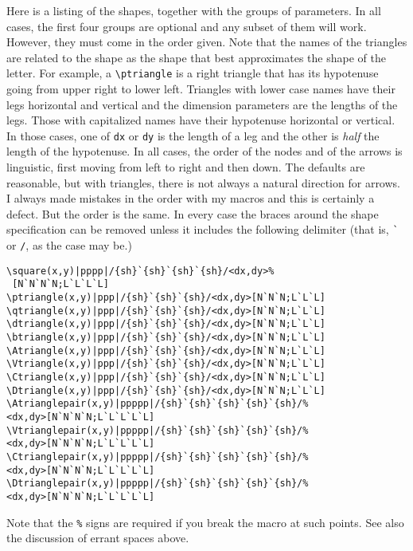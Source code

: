\documentclass[12pt]{article}
\begin{document}
{Here is a listing of the shapes, together with the groups of parameters.
In all cases, the first four groups are optional and any subset of them
will work.  However, they must come in the order given.  Note that the
names of the triangles are related to the shape as the shape that best
approximates the shape of the letter.  For example, a
\verb.\ptriangle. is a right triangle that has its
hypotenuse going from upper right to lower left.  Triangles with lower
case names have their legs horizontal and vertical and the dimension
parameters are the lengths of the legs.  Those with capitalized names
have their hypotenuse horizontal or vertical.  In those cases, one of
\verb.dx. or \verb.dy. is the length of a leg and
the other is {\em half} the length of the hypotenuse.  In all cases, the
order of the nodes and of the arrows is linguistic, first moving from
left to right and then down.  The defaults are reasonable, but with
triangles, there is not always a natural direction for arrows.  I always
made mistakes in the order with my macros and this is certainly a
defect.  But the order is the same.  In every case the braces around the
shape specification can be removed unless it includes the following
delimiter (that is, \verb.`. or \index{/}\verb./., as the case
may be.)
 \begin{verbatim}
\square(x,y)|pppp|/{sh}`{sh}`{sh}`{sh}/<dx,dy>%
 [N`N`N`N;L`L`L`L]
\ptriangle(x,y)|ppp|/{sh}`{sh}`{sh}/<dx,dy>[N`N`N;L`L`L]
\qtriangle(x,y)|ppp|/{sh}`{sh}`{sh}/<dx,dy>[N`N`N;L`L`L]
\dtriangle(x,y)|ppp|/{sh}`{sh}`{sh}/<dx,dy>[N`N`N;L`L`L]
\btriangle(x,y)|ppp|/{sh}`{sh}`{sh}/<dx,dy>[N`N`N;L`L`L]
\Atriangle(x,y)|ppp|/{sh}`{sh}`{sh}/<dx,dy>[N`N`N;L`L`L]
\Vtriangle(x,y)|ppp|/{sh}`{sh}`{sh}/<dx,dy>[N`N`N;L`L`L]
\Ctriangle(x,y)|ppp|/{sh}`{sh}`{sh}/<dx,dy>[N`N`N;L`L`L]
\Dtriangle(x,y)|ppp|/{sh}`{sh}`{sh}/<dx,dy>[N`N`N;L`L`L]
\Atrianglepair(x,y)|ppppp|/{sh}`{sh}`{sh}`{sh}`{sh}/%
<dx,dy>[N`N`N`N;L`L`L`L`L]
\Vtrianglepair(x,y)|ppppp|/{sh}`{sh}`{sh}`{sh}`{sh}/%
<dx,dy>[N`N`N`N;L`L`L`L`L]
\Ctrianglepair(x,y)|ppppp|/{sh}`{sh}`{sh}`{sh}`{sh}/%
<dx,dy>[N`N`N`N;L`L`L`L`L]
\Dtrianglepair(x,y)|ppppp|/{sh}`{sh}`{sh}`{sh}`{sh}/%
<dx,dy>[N`N`N`N;L`L`L`L`L]
\end{verbatim}
    
  
  
  
Note that the
\verb.%.  signs are required if you break the
macro at such points.  See also the discussion of errant spaces above.

}
\end{document}
